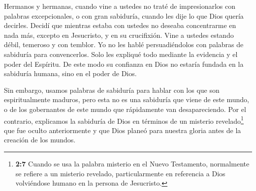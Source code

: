  Hermanos y hermanas, cuando vine a ustedes no traté de
impresionarlos con palabras excepcionales, o con gran sabiduría, cuando
les dije lo que Dios quería decirles.  Decidí que mientras
estaba con ustedes no deseaba concentrarme en nada más, excepto en
Jesucristo, y en su crucifixión.  Vine a ustedes estando
débil, temeroso y con temblor.  Yo no les hablé
persuadiéndolos con palabras de sabiduría para convencerlos. Solo les
expliqué todo mediante la evidencia y el poder del Espíritu.
 De este modo su confianza en Dios no estaría fundada en la
sabiduría humana, sino en el poder de Dios.

 Sin embargo, usamos palabras de sabiduría para hablar con
los que son espiritualmente maduros, pero esta no es una sabiduría que
viene de este mundo, o de los gobernantes de este mundo que rápidamente
van desapareciendo.  Por el contrario, explicamos la
sabiduría de Dios en términos de un misterio revelado\footnote{\textbf{2:7}
  Cuando se usa la palabra misterio en el Nuevo Testamento, normalmente
  se refiere a un misterio revelado, particularmente en referencia a
  Dios volviéndose humano en la persona de Jesucristo.} que fue oculto
anteriormente y que Dios planeó para nuestra gloria antes de la creación
de los mundos.

